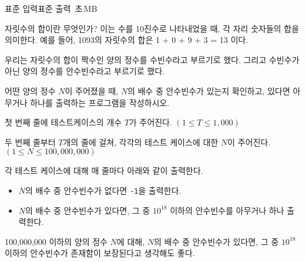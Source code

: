 \begin{problem}{\kcpcansubinsutitle}
    {표준 입력}{표준 출력}
    {\kcpcansubinsutime\,초}{\kcpcansubinsumemory\,MB}{}{\kcpcansubinsuscore}
    
    자릿수의 합이란 무엇인가? 이는 수를 10진수로 나타내었을 때, 각 자리 숫자들의 합을 의미한다. 예를 들어, 1093의 자릿수의 합은 1 + 0 + 9 + 3 = 13 이다.
    
    우리는 자릿수의 합이 짝수인 양의 정수를 수빈수라고 부르기로 했다. 그리고 수빈수가 아닌 양의 정수를 안수빈수라고 부르기로 했다.
    
    어떤 양의 정수 $ N $이 주어졌을 때, $ N $의 배수 중 안수빈수가 있는지 확인하고, 있다면 아무거나 하나를 출력하는 프로그램을 작성하시오.
    
    \InputFile
    첫 번째 줄에 테스트케이스의 개수 $ T $가 주어진다. $ (1 \leq T \leq 1,000) $
    
    두 번째 줄부터 $ T $개의 줄에 걸쳐, 각각의 테스트 케이스에 대한 $ N $이 주어진다. $ (1 \leq N \leq 100,000,000) $
    
    
    \OutputFile
    각 테스트 케이스에 대해 매 줄마다 아래와 같이 출력한다.
    \begin{itemize}
        \item $ N $의 배수 중 안수빈수가 없다면 \verb|-1|을 출력한다.
        \item $ N $의 배수 중 안수빈수가 있다면, 그 중 $ 10^{18} $ 이하의 안수빈수를 아무거나 하나 출력한다.
    \end{itemize}
    100,000,000 이하의 양의 정수 $ N $에 대해, $ N $의 배수 중 안수빈수가 있다면, 그 중 $ 10^{18} $ 이하의 안수빈수가 존재함이 보장된다고 생각해도 좋다.
   
    \Examples
    
    \begin{example}
    \end{example}
    
\end{problem}

